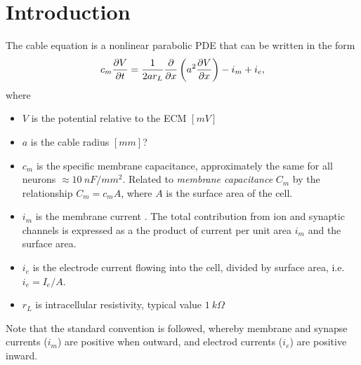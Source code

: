 \section*{Introduction}

The cable equation is a nonlinear parabolic PDE that can be written in the form
\begin{equation}
    c_m \frac{\partial{V}}{\partial{t}} = \frac{1}{2ar_{L}} \frac{\partial{}}{\partial{x}} \left( a^2 \frac{\partial{V}}{\partial{x}} \right) - i_m + i_e,
\end{equation}
where
\begin{itemize}
    \item $V$ is the potential relative to the ECM $[mV]$
    \item $a$ is the cable radius  $[mm]$?
    \item $c_m$ is the {specific membrane capacitance}, approximately the same for all neurons $\approx 10~nF/mm^2$. Related to \emph{membrane capacitance} $C_m$ by the relationship $C_m=c_{m}A$, where $A$ is the surface area of the cell.
    \item $i_m$ is the membrane current . The total contribution from ion and synaptic channels is expressed as a the product of current per unit area $i_m$ and the surface area.
    \item $i_e$ is the electrode current flowing into the cell, divided by surface area, i.e. $i_e=I_e/A$.
    \item $r_L$ is intracellular resistivity, typical value $1~k\Omega$
\end{itemize}

Note that the standard convention is followed, whereby membrane and synapse currents ($i_m$) are positive when outward, and electrod currents ($i_e$) are positive inward.

